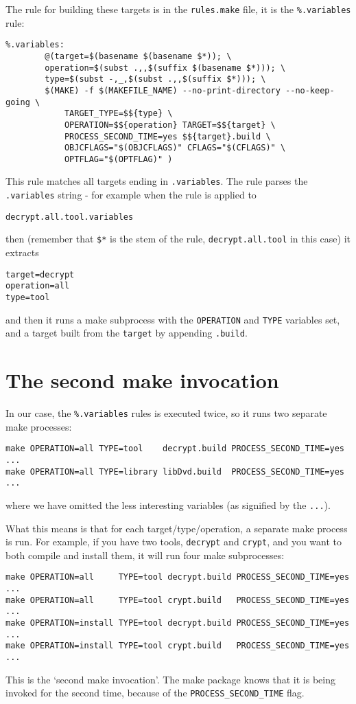 \documentclass[a4paper]{article}
\begin{document}
The rule for building these targets is in the \texttt{rules.make} file, 
it is the \texttt{\%.variables} rule:
\begin{verbatim}
%.variables:
        @(target=$(basename $(basename $*)); \
        operation=$(subst .,,$(suffix $(basename $*))); \
        type=$(subst -,_,$(subst .,,$(suffix $*))); \
        $(MAKE) -f $(MAKEFILE_NAME) --no-print-directory --no-keep-going \
            TARGET_TYPE=$${type} \
            OPERATION=$${operation} TARGET=$${target} \
            PROCESS_SECOND_TIME=yes $${target}.build \
            OBJCFLAGS="$(OBJCFLAGS)" CFLAGS="$(CFLAGS)" \
            OPTFLAG="$(OPTFLAG)" )
\end{verbatim}
This rule matches all targets ending in \texttt{.variables}.  The rule 
parses the \texttt{.variables} string - for example when the rule 
is applied to 
\begin{verbatim}
decrypt.all.tool.variables
\end{verbatim}
then (remember that \texttt{\$*} is the stem of the rule,
\texttt{decrypt.all.tool} in this case) it extracts
\begin{verbatim}
target=decrypt
operation=all
type=tool
\end{verbatim}
and then it runs a make subprocess with the \texttt{OPERATION} and 
\texttt{TYPE} variables set, and a target built from the \texttt{target} 
by appending \texttt{.build}.

\section{The second make invocation}
In our case, the \texttt{\%.variables} rules is executed twice, so it
runs two separate make processes:
\begin{verbatim}
make OPERATION=all TYPE=tool    decrypt.build PROCESS_SECOND_TIME=yes ...
make OPERATION=all TYPE=library libDvd.build  PROCESS_SECOND_TIME=yes ...
\end{verbatim}
where we have omitted the less interesting variables (as signified by the 
\texttt{...}).

What this means is that for each target/type/operation, a separate
make process is run.  For example, if you have two tools,
\texttt{decrypt} and \texttt{crypt}, and you want to both compile and install
them, it will run four make subprocesses:
\begin{verbatim}
make OPERATION=all     TYPE=tool decrypt.build PROCESS_SECOND_TIME=yes ...
make OPERATION=all     TYPE=tool crypt.build   PROCESS_SECOND_TIME=yes ...
make OPERATION=install TYPE=tool decrypt.build PROCESS_SECOND_TIME=yes ...
make OPERATION=install TYPE=tool crypt.build   PROCESS_SECOND_TIME=yes ...
\end{verbatim}
This is the `second make invocation'.  The make package knows that it
is being invoked for the second time, because of the
\texttt{PROCESS\_SECOND\_TIME} flag.
\end{document}
